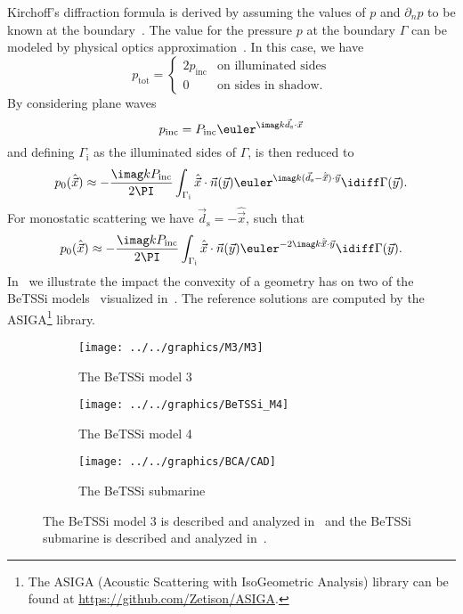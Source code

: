 Kirchoff's diffraction formula is derived by assuming the values of $p$ and $\partial_n p$ to be known at the boundary~\cite{Fawcett2001moh}. The value for the pressure $p$ at the boundary $\Gamma$ can be modeled by physical optics approximation~\cite[p. 147]{Chandler_Wilde2012nab}. In this case, we have
\begin{equation*}
	p_{\mathrm{tot}} = \begin{cases} 2p_{\mathrm{inc}} & \text{on illuminated sides}\\
		0 & \text{on sides in shadow}.
		\end{cases}
\end{equation*}
By considering plane waves 
\begin{equation}\label{Eq4:PlaneWave}
	p_{\mathrm{inc}} = P_{\mathrm{inc}}\euler^{\imag k\vec{d}_{\mathrm{s}}\cdot \vec{x}}
\end{equation}
and defining $\Gamma_{\mathrm{i}}$ as the illuminated sides of $\Gamma$,  is then reduced to
\begin{equation}\label{Eq4:bistatic}
	p_0(\hat{\vec{x}}) \approx -\frac{\imag kP_{\mathrm{inc}}}{2\PI}\int_{\Gamma_{\mathrm{i}}} \hat{\vec{x}}\cdot\vec{n}(\vec{y}) \euler^{\imag k (\vec{d}_{\mathrm{s}} - \hat{\vec{x}})\cdot\vec{y}}\idiff \Gamma(\vec{y}).
\end{equation}
For monostatic scattering we have $\vec{d}_{\mathrm{s}} =- \hat{\vec{x}}$, such that
\begin{equation}\label{Eq4:monostatic}
	p_0(\hat{\vec{x}}) \approx -\frac{\imag kP_{\mathrm{inc}}}{2\PI}\int_{\Gamma_{\mathrm{i}}} \hat{\vec{x}}\cdot\vec{n}(\vec{y}) \euler^{-2\imag k \hat{\vec{x}}\cdot\vec{y}}\idiff \Gamma(\vec{y}).
\end{equation}
In~ we illustrate the impact the convexity of a geometry has on two of the BeTSSi models~\cite{Nolte2014bib} visualized in~. The reference solutions are computed by the ASIGA\footnote{The ASIGA (Acoustic Scattering with IsoGeometric Analysis) library can be found at \href{https://github.com/Zetison/ASIGA}{https://github.com/Zetison/ASIGA}.} library.
\begin{figure}
	\centering
	\begin{subfigure}{0.7\textwidth}
		\centering
		\texttt{[image: ../../graphics/M3/M3]} %
		\caption{The BeTSSi model 3}
	\end{subfigure}%
	\begin{subfigure}{0.3\textwidth}
		\centering
		\texttt{[image: ../../graphics/BeTSSi\_M4]}
		\caption{The BeTSSi model 4}
	\end{subfigure}
	\par\bigskip
	\par\bigskip
	\begin{subfigure}{\textwidth}
		\centering
		\texttt{[image: ../../graphics/BCA/CAD]}
		\caption{The BeTSSi submarine}
	\end{subfigure}
	\caption{The BeTSSi model 3 is described and analyzed in~\cite{Venas2015iao} and the BeTSSi submarine is described and analyzed in~\cite{Venas2019ibe}.}
	\label{Fig4:BeTSSiModels}
\end{figure}
